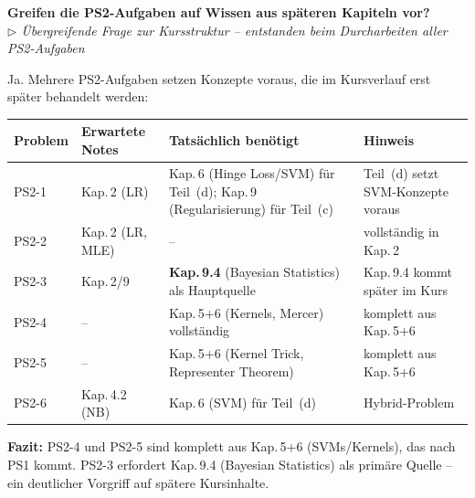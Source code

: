 \documentclass[11pt, a4paper]{article}
\newenvironment{frage}[2]{%
  \begin{tcolorbox}[frageboxstyle, title={Frage}]
  \textbf{#1}\\[3pt]
  {\small\itshape\color{black!55}\(\triangleright\) #2}
  \end{tcolorbox}
  \begin{tcolorbox}[antwortboxstyle]
}{%
  \end{tcolorbox}
  \vspace{4mm}
}
\begin{document}
\begin{frage}{Greifen die PS2-Aufgaben auf Wissen aus späteren Kapiteln vor?}{Übergreifende Frage zur Kursstruktur -- entstanden beim Durcharbeiten aller PS2-Aufgaben}

Ja. Mehrere PS2-Aufgaben setzen Konzepte voraus, die im Kursverlauf erst später behandelt werden:

\begin{center}
\begin{tabular}{p{2.5cm} p{3.5cm} p{4cm} p{4cm}}
  \toprule
  \textbf{Problem} & \textbf{Erwartete Notes} & \textbf{Tatsächlich benötigt} & \textbf{Hinweis} \\
  \midrule
  PS2-1 & Kap.\,2 (LR) & Kap.\,6 (Hinge Loss/SVM) für Teil~(d); Kap.\,9 (Regularisierung) für Teil~(c) & Teil~(d) setzt SVM-Konzepte voraus \\
  \addlinespace
  PS2-2 & Kap.\,2 (LR, MLE) & -- & vollständig in Kap.\,2 \\
  \addlinespace
  PS2-3 & Kap.\,2/9 & \textbf{Kap.\,9.4} (Bayesian Statistics) als Hauptquelle & Kap.\,9.4 kommt später im Kurs \\
  \addlinespace
  PS2-4 & -- & Kap.\,5+6 (Kernels, Mercer) vollständig & komplett aus Kap.\,5+6 \\
  \addlinespace
  PS2-5 & -- & Kap.\,5+6 (Kernel Trick, Representer Theorem) & komplett aus Kap.\,5+6 \\
  \addlinespace
  PS2-6 & Kap.\,4.2 (NB) & Kap.\,6 (SVM) für Teil~(d) & Hybrid-Problem \\
  \bottomrule
\end{tabular}
\end{center}

\textbf{Fazit:} PS2-4 und PS2-5 sind komplett aus Kap.\,5+6 (SVMs/Kernels), das nach PS1 kommt. PS2-3
erfordert Kap.\,9.4 (Bayesian Statistics) als primäre Quelle -- ein deutlicher Vorgriff auf spätere
Kursinhalte.

\end{frage}
\end{document}
